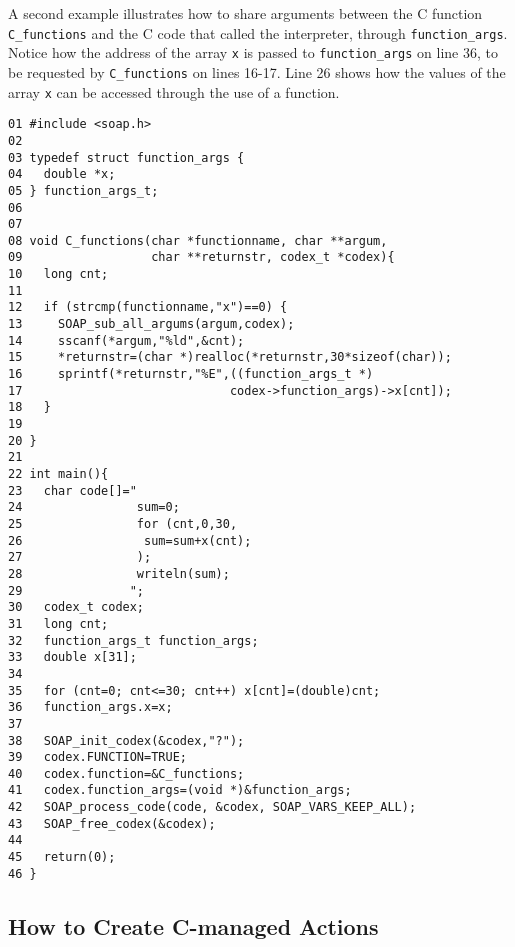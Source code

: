 \documentclass{warpdoc}
\begin{document}
A second example illustrates how to share arguments between the C function
\verb|C_functions| and the C code that called the interpreter, through
\verb|function_args|. Notice how the address of the array \verb|x| is passed
to \verb|function_args| on line 36, to be requested by \verb|C_functions| on
lines 16-17. Line 26 shows how the values of the array \verb|x| can be accessed
through the use of a function.
%
\begin{verbatim}
01 #include <soap.h>
02
03 typedef struct function_args {
04   double *x;
05 } function_args_t;
06
07
08 void C_functions(char *functionname, char **argum,
09                  char **returnstr, codex_t *codex){
10   long cnt;
11
12   if (strcmp(functionname,"x")==0) {
13     SOAP_sub_all_argums(argum,codex);
14     sscanf(*argum,"%ld",&cnt);
15     *returnstr=(char *)realloc(*returnstr,30*sizeof(char));
16     sprintf(*returnstr,"%E",((function_args_t *)
17                             codex->function_args)->x[cnt]);
18   }
19
20 }
21
22 int main(){
23   char code[]="
24                sum=0;
25                for (cnt,0,30,
26                 sum=sum+x(cnt);
27                );
28                writeln(sum);
29               ";
30   codex_t codex;
31   long cnt;
32   function_args_t function_args;
33   double x[31];
34
35   for (cnt=0; cnt<=30; cnt++) x[cnt]=(double)cnt;
36   function_args.x=x;
37
38   SOAP_init_codex(&codex,"?");
39   codex.FUNCTION=TRUE;
40   codex.function=&C_functions;
41   codex.function_args=(void *)&function_args;
42   SOAP_process_code(code, &codex, SOAP_VARS_KEEP_ALL);
43   SOAP_free_codex(&codex);
44
45   return(0);
46 }
\end{verbatim}
%




\subsection{How to Create C-managed Actions}
\end{document}
